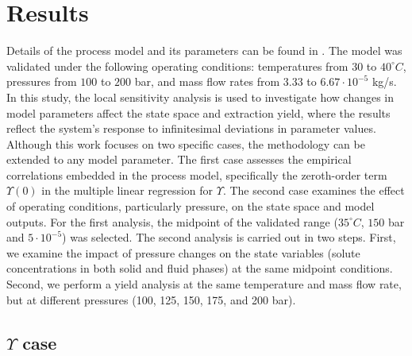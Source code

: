 \documentclass[a4paper,fleqn]{cas-dc}
\begin{document}
	\section{Results} \label{CH: Results}
	Details of the process model and its parameters can be found in \citet{Sliczniuk2024}. The model was validated under the following operating conditions: temperatures from $30$ to $40 ^\circ C$, pressures from $100$ to $200$ bar, and mass flow rates from $3.33$ to $6.67 \cdot 10^{-5}$ kg/s. In this study, the local sensitivity analysis is used to investigate how changes in model parameters affect the state space and extraction yield, where the results reflect the system’s response to infinitesimal deviations in parameter values. Although this work focuses on two specific cases, the methodology can be extended to any model parameter. The first case assesses the empirical correlations embedded in the process model, specifically the zeroth-order term $\Upsilon(0)$ in the multiple linear regression for $\Upsilon$. The second case examines the effect of operating conditions, particularly pressure, on the state space and model outputs. For the first analysis, the midpoint of the validated range ($35 ^\circ C$, $150$ bar and $5\cdot 10^{-5}$) was selected. The second analysis is carried out in two steps. First, we examine the impact of pressure changes on the state variables (solute concentrations in both solid and fluid phases) at the same midpoint conditions. Second, we perform a yield analysis at the same temperature and mass flow rate, but at different pressures (100, 125, 150, 175, and 200 bar).
	
	\subsection{$\Upsilon$ case}
	
\end{document}
